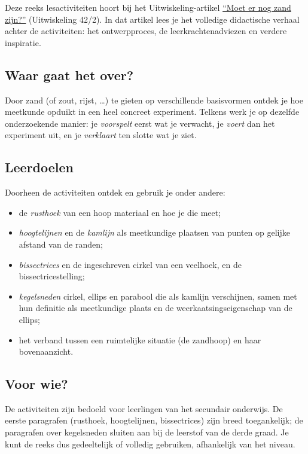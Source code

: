 \documentclass{ximera}
\begin{document}
\author{Alexander Holvoet}

Deze reeks lesactiviteiten hoort bij het Uitwiskeling-artikel
\href{https://www.uitwiskeling.be/2026/04/16/zandhopen/}{``Moet er nog zand zijn?''}
(Uitwiskeling 42/2). In dat artikel lees je het volledige didactische verhaal achter de
activiteiten: het ontwerpproces, de leerkrachtenadviezen en verdere inspiratie.

\subsection*{Waar gaat het over?}

Door zand (of zout, rijst, \ldots) te gieten op verschillende basisvormen ontdek je hoe
meetkunde opduikt in een heel concreet experiment. Telkens werk je op dezelfde
onderzoekende manier: je \emph{voorspelt} eerst wat je verwacht, je \emph{voert} dan het
experiment uit, en je \emph{verklaart} ten slotte wat je ziet.

\subsection*{Leerdoelen}

Doorheen de activiteiten ontdek en gebruik je onder andere:
\begin{itemize}
    \item de \emph{rusthoek} van een hoop materiaal en hoe je die meet;
    \item \emph{hoogtelijnen} en de \emph{kamlijn} als meetkundige plaatsen van punten op
        gelijke afstand van de randen;
    \item \emph{bissectrices} en de ingeschreven cirkel van een veelhoek, en de
        bissectricestelling;
    \item \emph{kegelsneden} \textemdash{} cirkel, ellips en parabool \textemdash{} die als
        kamlijn verschijnen, samen met hun definitie als meetkundige plaats en de
        weerkaatsingseigenschap van de ellips;
    \item het verband tussen een ruimtelijke situatie (de zandhoop) en haar bovenaanzicht.
\end{itemize}

\subsection*{Voor wie?}

De activiteiten zijn bedoeld voor leerlingen van het secundair onderwijs. De eerste
paragrafen (rusthoek, hoogtelijnen, bissectrices) zijn breed toegankelijk; de paragrafen
over kegelsneden sluiten aan bij de leerstof van de derde graad. Je kunt de reeks dus
gedeeltelijk of volledig gebruiken, afhankelijk van het niveau.
\end{document}
